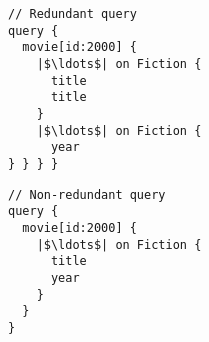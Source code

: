 









\smallskip

\begin{minipage}[t]{.25\textwidth}
\begin{verbatim}
// Redundant query
query {
  movie[id:2000] {
    |$\ldots$| on Fiction {
      title
      title
    }
    |$\ldots$| on Fiction {
      year
} } } }
\end{verbatim}
\end{minipage}%
\begin{minipage}[t]{.25\textwidth}
\begin{verbatim}
// Non-redundant query
query {
  movie[id:2000] {
    |$\ldots$| on Fiction {
      title
      year
    }
  }
}
\end{verbatim} 
\end{minipage}

\bigskip

